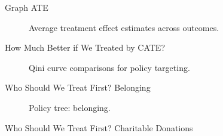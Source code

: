 \documentclass[
  ignorenonframetext,
  aspectratio=169,
]{beamer}
\begin{document}
\begin{frame}[fragile]{Graph ATE}
\label{graph-ate}
\begin{figure}


\caption{\label{fig-ate}Average treatment effect estimates across
outcomes.}

\end{figure}%

\begin{block}{How Much Better if We Treated by CATE?}
\label{how-much-better-if-we-treated-by-cate}
\begin{figure}


\caption{\label{fig-qini}Qini curve comparisons for policy targeting.}

\end{figure}%
\end{block}

\begin{block}{Who Should We Treat First? Belonging}
\label{who-should-we-treat-first-belonging}
\begin{figure}


\caption{\label{fig-policy-belonging}Policy tree: belonging.}

\end{figure}%
\end{block}

\begin{block}{Who Should We Treat First? Charitable Donations}
\label{who-should-we-treat-first-charitable-donations}
\begin{figure}


\end{figure}
\end{block}
\end{frame}
\end{document}
